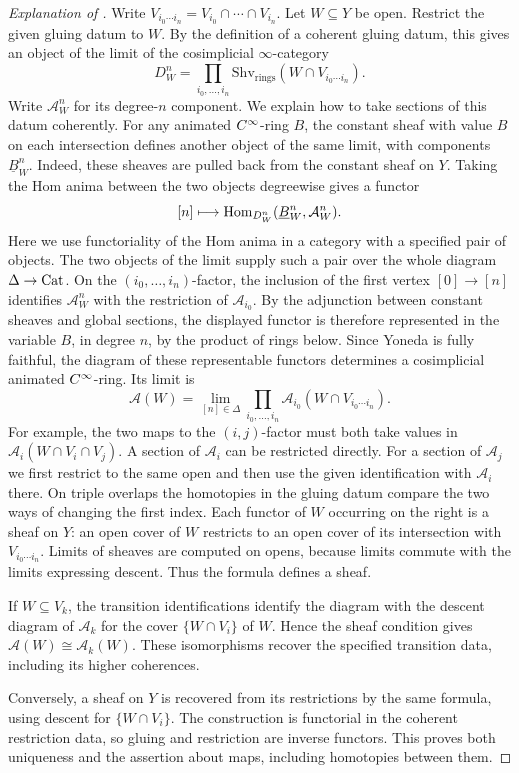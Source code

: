 \begin{proof}[Explanation of ]
Write $V_{i_0\cdots i_n}=V_{i_0}\cap\cdots\cap V_{i_n}$.
Let $W\subseteq Y$ be open. Restrict the given gluing datum to $W$.
By the definition of a coherent gluing datum, this gives an object of the
limit of the cosimplicial $\infty$-category
\[
 D_W^n=\prod_{i_0,\ldots,i_n}
 \mathrm{Shv}_{\mathrm{rings}}(W\cap V_{i_0\cdots i_n}).
\]
Write $\mathcal A_W^n$ for its degree-$n$ component. We explain how
to take sections of this datum coherently. For any animated $C^\infty$-ring $B$, the constant sheaf with value $B$ on each intersection
defines another object of the same limit, with components
$\underline B_W^n$. Indeed, these sheaves are pulled back from the
constant sheaf on $Y$. Taking the Hom anima between the two objects
degreewise gives a functor
\[
 [n]\longmapsto\operatorname{Hom}_{D_W^n}(\underline B_W^n,\mathcal A_W^n).
\]
Here we use functoriality of the Hom anima in a category with a
specified pair of objects. The two objects of the limit supply such
a pair over the whole diagram $\Delta\to\mathrm{Cat}$. On the
$(i_0,\ldots,i_n)$-factor, the inclusion of the first vertex
$[0]\to[n]$ identifies $\mathcal A_W^n$ with the restriction of
$\mathcal A_{i_0}$. By the adjunction between constant sheaves and
global sections, the displayed functor is therefore represented in
the variable $B$, in degree $n$, by the product of rings below.
Since Yoneda is fully faithful, the diagram of these representable
functors determines a cosimplicial animated $C^\infty$-ring. Its limit is
\begin{equation}\label{eq:Glued_Animated_Structure_Sheaf}
 \mathcal A(W)=
 \lim_{[n]\in\Delta}
 \prod_{i_0,\ldots,i_n}
 \mathcal A_{i_0}(W\cap V_{i_0\cdots i_n}).
\end{equation}
For example, the two maps to the $(i,j)$-factor must both take values
in $\mathcal A_i(W\cap V_i\cap V_j)$. A section of $\mathcal A_i$
can be restricted directly. For a section of $\mathcal A_j$ we first
restrict to the same open and then use the given identification
with $\mathcal A_i$ there. On triple overlaps the homotopies in the
gluing datum compare the two ways of changing the first index.
Each functor of $W$ occurring on the right is a sheaf on $Y$:
an open cover of $W$ restricts to an open cover of its intersection
with $V_{i_0\cdots i_n}$. Limits of sheaves are computed on opens,
because limits commute with the limits expressing descent.
Thus the formula defines a sheaf.

If $W\subseteq V_k$, the transition identifications identify the
diagram with the descent diagram of $\mathcal A_k$ for the cover
$\{W\cap V_i\}$ of $W$. Hence the sheaf condition gives
$\mathcal A(W)\cong\mathcal A_k(W)$. These isomorphisms recover
the specified transition data, including its higher coherences.

Conversely, a sheaf on $Y$ is recovered from its restrictions by
the same formula, using descent for $\{W\cap V_i\}$. The construction
is functorial in the coherent restriction data, so gluing and
restriction are inverse functors. This proves both uniqueness and
the assertion about maps, including homotopies between them.
\end{proof}

